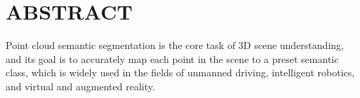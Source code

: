 



\chapter{ABSTRACT}
\xiaosi
Point cloud semantic segmentation is the core task of 3D scene understanding, and its goal is to accurately map each point in the scene to a preset semantic class, which is widely used in the fields of unmanned driving, intelligent robotics, and virtual and augmented reality. 
